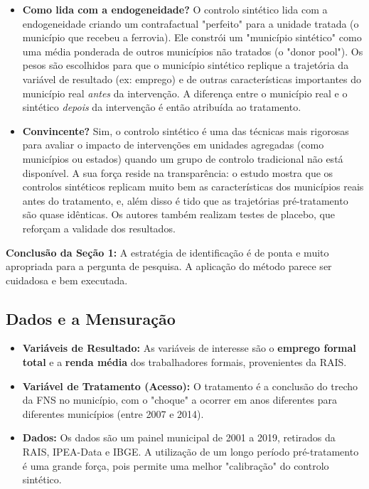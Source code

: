 \documentclass[12pt, a4paper]{article}
\begin{document}
\begin{itemize}
    \item \textbf{Como lida com a endogeneidade?} O controlo sintético lida com a endogeneidade criando um contrafactual "perfeito" para a unidade tratada (o município que recebeu a ferrovia). Ele constrói um "município sintético" como uma média ponderada de outros municípios não tratados (o "donor pool"). Os pesos são escolhidos para que o município sintético replique a trajetória da variável de resultado (ex: emprego) e de outras características importantes do município real \textit{antes} da intervenção. A diferença entre o município real e o sintético \textit{depois} da intervenção é então atribuída ao tratamento.
    \item \textbf{Convincente?} Sim, o controlo sintético é uma das técnicas mais rigorosas para avaliar o impacto de intervenções em unidades agregadas (como municípios ou estados) quando um grupo de controlo tradicional não está disponível. A sua força reside na transparência: o estudo mostra que os controlos sintéticos replicam muito bem as características dos municípios reais antes do tratamento, e, além disso é tido que as trajetórias pré-tratamento são quase idênticas. Os autores também realizam testes de placebo, que reforçam a validade dos resultados.
\end{itemize}

\noindent\textbf{Conclusão da Seção 1:} A estratégia de identificação é de ponta e muito apropriada para a pergunta de pesquisa. A aplicação do método parece ser cuidadosa e bem executada.

\subsection{Dados e a Mensuração}

\begin{itemize}
    \item \textbf{Variáveis de Resultado:} As variáveis de interesse são o \textbf{emprego formal total} e a \textbf{renda média} dos trabalhadores formais, provenientes da RAIS.
    \item \textbf{Variável de Tratamento (Acesso):} O tratamento é a conclusão do trecho da FNS no município, com o "choque" a ocorrer em anos diferentes para diferentes municípios (entre 2007 e 2014).
    \item \textbf{Dados:} Os dados são um painel municipal de 2001 a 2019, retirados da RAIS, IPEA-Data e IBGE. A utilização de um longo período pré-tratamento é uma grande força, pois permite uma melhor "calibração" do controlo sintético.
\end{itemize}
\end{document}
